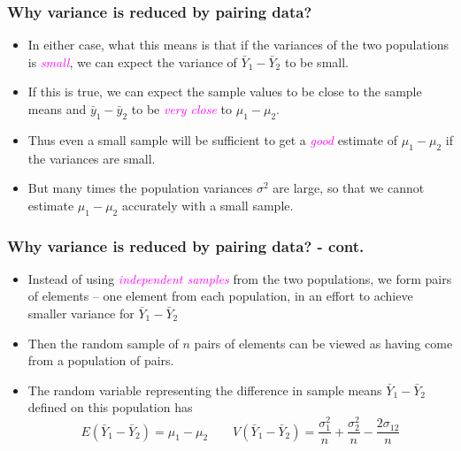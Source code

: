 \documentclass[xcolor=dvipsnames,12pt]{beamer}
\begin{document}
\begin{frame}
\frametitle{{Why variance is reduced by pairing data?}}
\begin{itemize}
\item In either case, what this means is that if the variances of  
the two populations is \textcolor{magenta}{\textit{small}}, we can expect the variance of
$\bar{Y}_1 - \bar{Y}_2$ to be small.
\item If this is true, we can expect the sample values to be close to the 
sample means and $\bar{y}_1 - \bar{y}_2$ to be  \textcolor{magenta}{\textit{very close}}
to $\mu_1 - \mu_2$.  
\item  Thus even a small sample will be sufficient to get a
\textcolor{magenta}{\textit{good}} estimate of $\mu_1 - \mu_2$ if the variances are small. 
\item But many times the population variances $\sigma^2$ are large, 
so that we cannot estimate $\mu_1 - \mu_2$ accurately with a small sample.
\end{itemize}
\end{frame}



\begin{frame}
\frametitle{{Why variance is reduced by pairing data? - cont.}}
\begin{itemize}
\item Instead of using \textcolor{magenta}{\textit{independent samples}} from the two
populations, we form pairs of elements -- one element
from each population, in an effort to achieve smaller
variance for $\bar{Y}_1 - \bar{Y}_2$
\item Then the random sample of $n$ pairs of elements can be viewed
as having come from a population of pairs. 
\item The random variable representing the difference in sample 
means  $\bar{Y}_1 - \bar{Y}_2$ defined on this
population has
$$
  E(\bar{Y}_1 - \bar{Y}_2) = \mu_1 - \mu_2 \quad \quad
  V(\bar{Y}_1 - \bar{Y}_2) = \frac{\sigma_1^2}{n} + 
  \frac{\sigma_2^2}{n} - \frac{2\sigma_{12}}{n}
$$
\end{itemize}
\end{frame}
\end{document}
